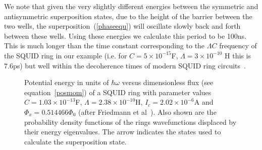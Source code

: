 \documentclass[twocolumn,a4paper,superscriptaddress,showpacs,floatfix,pra]{revtex4}
\begin{document}
We note  that given the  very slightly different energies  between the
symmetric and antisymmetric superposition states, due to the height of
the barrier between  the two wells, the superposition~(\ref{phaseequ})
will oscillate slowly back and  forth between these wells. Using these
energies we  calculate this  period to be  100ns. This is  much longer
than the time  constant corresponding to the $\Lambda  C$ frequency of
the    SQUID   ring    in   our    example   (i.e.    for   $C=5\times
10^{-15}$\textrm{F},  $\Lambda =3\times  10^{-10}$ \textrm{H}  this is
$7.6$\textrm{ps})  but well  within  the decoherence  times of  modern
SQUID ring circuits~\cite{Martinis2002,Zhou2002,Han2001,Mooij2003}.

\begin{figure}[!t]
\begin{center}
\end{center}
\caption{Potential   energy  in   units  of   $\hbar   \omega$  versus
dimensionless flux  (see equation~\ref{posmom})  of a SQUID  ring with
parameter  values  $  C=1.03\times  10^{-13}$F,  $\Lambda  =2.38\times
10^{-10}$H,  $I_{c}=2.02\times 10^{-6}$A  and  $\Phi _{x}=0.514466\Phi
_{0}$  (after  Friedmann  et  al~\protect\cite{FriedmanPCTL00}).  Also
shown are the probability density functions of the rings wavefunctions
displaced by their energy eigenvalues.  The arrow indicates the states
used to calculate the superposition state.}
\label{friedpot}
\end{figure}
\end{document}
